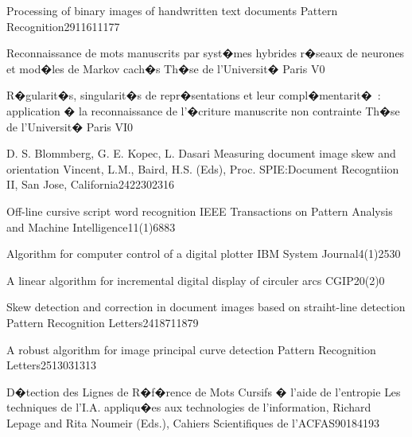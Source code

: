
 


{Processing of binary images of handwritten text documents}
{Pattern Recognition}{29}{1161}{1177}

{Reconnaissance de mots manuscrits par syst�mes hybrides r�seaux de neurones et mod�les de Markov cach�s}
{Th�se de l'Universit� Paris V}{}{0}{}

{R�gularit�s, singularit�s de repr�sentations et leur compl�mentarit�~: application � la reconnaissance de l'�criture manuscrite non contrainte}
{Th�se de l'Universit� Paris VI}{}{0}{}

 {D. S. Blommberg, G. E. Kopec, L. Dasari}
{Measuring document image skew and orientation}
{Vincent, L.M., Baird, H.S. (Eds), Proc. SPIE:Document Recogntiion II, San Jose, California}{2422}{302}{316}

{Off-line cursive script word recognition}
{IEEE Transactions on Pattern Analysis and Machine Intelligence}{11(1)}{68}{83}

{Algorithm for computer control of a digital plotter}
{IBM System Journal}{4(1)}{25}{30}

{A linear algorithm for incremental digital display of circuler arcs}
{CGIP}{20(2)}{0}{}

{Skew detection and correction in document images based on straiht-line detection}
{Pattern Recognition Letters}{24}{1871}{1879}

{A robust algorithm for image principal curve detection}
{Pattern Recognition Letters}{25}{1303}{1313}

{D�tection des Lignes de R�f�rence de Mots Cursifs � l'aide de l'entropie}
{Les techniques de l'I.A. appliqu�es aux technologies de l'information, Richard Lepage and Rita Noumeir (Eds.), Cahiers Scientifiques de l'ACFAS}{90}{184}{193}


